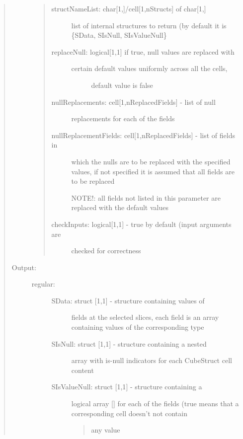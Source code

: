 \documentclass[letterpaper,10pt,english]{sphinxmanual}
\begin{document}
\begin{quote}
\begin{description}
\begin{quote}
\begin{description}
\item[{structNameList: char{[}1,{]}/cell{[}1,nStructs{]} of char{[}1,{]}}] \leavevmode
list of internal structures to return (by default it
is \{SData, SIsNull, SIsValueNull\}

\item[{replaceNull: logical{[}1,1{]} if true, null values are replaced with}] \leavevmode\begin{description}
\item[{certain default values uniformly across all the cells,}] \leavevmode
default value is false

\end{description}

\item[{nullReplacements: cell{[}1,nReplacedFields{]}  - list of null}] \leavevmode
replacements for each of the fields

\item[{nullReplacementFields: cell{[}1,nReplacedFields{]} - list of fields in}] \leavevmode
which the nulls are to be replaced with the specified values,
if not specified it is assumed that all fields are to be
replaced

NOTE!: all fields not listed in this parameter are replaced with
the default values

\item[{checkInputs: logical{[}1,1{]} - true by default (input arguments are}] \leavevmode
checked for correctness

\end{description}
\end{quote}

\item[{Output:}] \leavevmode\begin{description}
\item[{regular:}] \leavevmode\begin{description}
\item[{SData: struct {[}1,1{]} - structure containing values of}] \leavevmode
fields at the selected slices, each field is an array
containing values of the corresponding type

\item[{SIsNull: struct {[}1,1{]} - structure containing a nested}] \leavevmode
array with is-null indicators for each CubeStruct cell content

\item[{SIsValueNull: struct {[}1,1{]} - structure containing a}] \leavevmode
logical array {[}{]} for each of the fields (true
means that a corresponding cell doesn't not contain
\begin{quote}

any value
\end{quote}

\end{description}

\end{description}

\end{description}
\end{quote}
\end{document}
